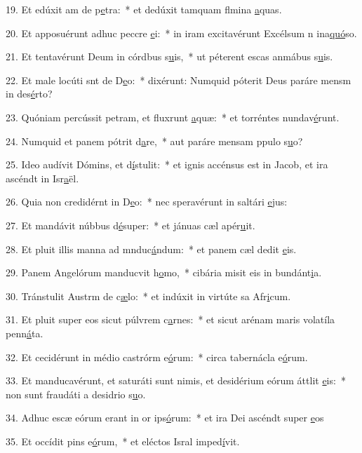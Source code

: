 19. Et edúxit am de p\uline{e}tra:~* et dedúxit tamquam flmina \uline{a}quas.\par 
20. Et apposuérunt adhuc peccre \uline{e}i:~* in iram excitavérunt Excélsum n ina\uline{quó}so.\par 
21. Et tentavérunt Deum in córdbus s\uline{u}is,~* ut péterent escas anmábus s\uline{u}is.\par 
22. Et male locúti snt de D\uline{e}o:~* dixérunt: Numquid póterit Deus paráre mensm in des\uline{é}rto?\par 
23. Quóniam percússit petram, et fluxrunt \uline{a}quæ:~* et torréntes nundav\uline{é}runt.\par 
24. Numquid et panem pótrit d\uline{a}re,~* aut paráre mensam ppulo s\uline{u}o?\par 
25. Ideo audívit Dómins, et d\uline{í}stulit:~* et ignis accénsus est in Jacob, et ira ascéndt in Isr\uline{a}ël.\par 
26. Quia non credidérnt in D\uline{e}o:~* nec speravérunt in saltári \uline{e}jus:\par 
27. Et mandávit núbbus d\uline{é}super:~* et jánuas cæl apér\uline{u}it.\par 
28. Et pluit illis manna ad mnduc\uline{á}ndum:~* et panem cæl dedit \uline{e}is.\par 
29. Panem Angelórum manducvit h\uline{o}mo,~* cibária misit eis in bundánt\uline{i}a.\par 
30. Tránstulit Austrm de c\uline{æ}lo:~* et indúxit in virtúte sa Afr\uline{i}cum.\par 
31. Et pluit super eos sicut púlvrem c\uline{a}rnes:~* et sicut arénam maris volatíla penn\uline{á}ta.\par 
32. Et cecidérunt in médio castrórm e\uline{ó}rum:~* circa tabernácla e\uline{ó}rum.\par 
33. Et manducavérunt, et saturáti sunt nimis, et desidérium eórum áttlit \uline{e}is:~* non sunt fraudáti a desidrio s\uline{u}o.\par 
34. Adhuc escæ eórum erant in or ips\uline{ó}rum:~* et ira Dei ascéndt super \uline{e}os\par 
35. Et occídit pins e\uline{ó}rum,~* et eléctos Isral imped\uline{í}vit.\par 
